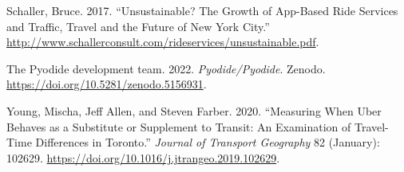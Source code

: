 \documentclass[
  letterpaper,
]{article}
\newlength{\cslhangindent}
\newlength{\cslentryspacingunit} %
\newenvironment{CSLReferences}[2] %
 {%
  \setlength{\parindent}{0pt}
  \ifodd #1
  \let\oldpar\par
  \def\par{\hangindent=\cslhangindent\oldpar}
  \fi
  \setlength{\parskip}{#2\cslentryspacingunit}
 }%
 {}
\begin{document}
\begin{CSLReferences}{1}{0}
\leavevmode{}%
Schaller, Bruce. 2017. {``Unsustainable? The Growth of App-Based Ride
Services and Traffic, Travel and the Future of New York City.''}
\url{http://www.schallerconsult.com/rideservices/unsustainable.pdf}.

\leavevmode{}%
The Pyodide development team. 2022. \emph{Pyodide/Pyodide}. Zenodo.
\url{https://doi.org/10.5281/zenodo.5156931}.

\leavevmode{}%
Young, Mischa, Jeff Allen, and Steven Farber. 2020. {``Measuring When
Uber Behaves as a Substitute or Supplement to Transit: An Examination of
Travel-Time Differences in Toronto.''} \emph{Journal of Transport
Geography} 82 (January): 102629.
\url{https://doi.org/10.1016/j.jtrangeo.2019.102629}.

\end{CSLReferences}
\end{document}
